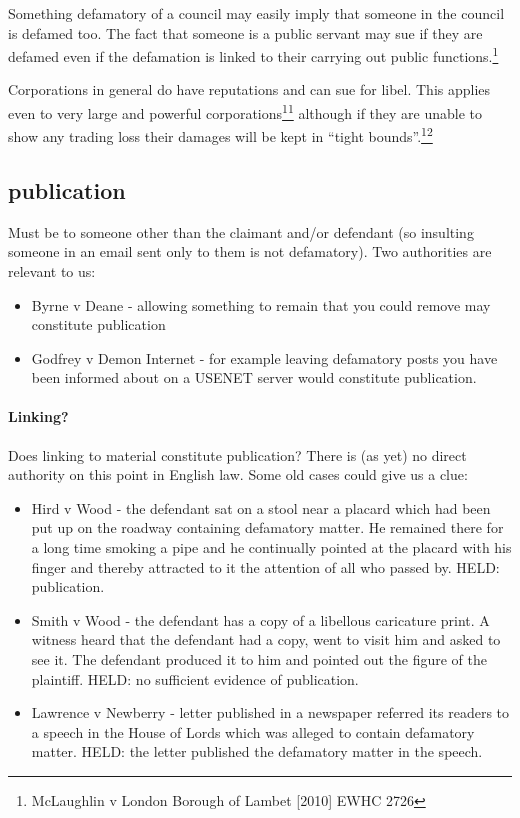 \documentclass[]{article}
\begin{document}
Something defamatory of a council may easily imply that someone in the
council is defamed too. The fact that someone is a public servant may sue if they are defamed even if the defamation is linked to their carrying out public functions.\footnote{McLaughlin v London Borough of Lambet [2010] EWHC 2726}

Corporations in general do have reputations and can sue for libel. This
applies even to very large and powerful
corporations\hyperref[sdfootnote11sym]{\textsuperscript{11}} although if
they are unable to show any trading loss their damages will be kept in
``tight bounds''.\hyperref[sdfootnote12sym]{\textsuperscript{12}}

\subsection{publication}

Must be to someone other than the claimant and/or defendant (so
insulting someone in an email sent only to them is not defamatory). Two
authorities are relevant to us:

\begin{itemize}
\item
  Byrne v Deane - allowing something to remain that you could remove may
  constitute publication
\item
  Godfrey v Demon Internet - for example leaving defamatory posts you
  have been informed about on a USENET server would constitute
  publication.
\end{itemize}

\paragraph{Linking?}

Does linking to material constitute publication? There is (as yet) no
direct authority on this point in English law. Some old cases could give
us a clue:

\begin{itemize}
\item
  Hird v Wood - the defendant sat on a stool near a placard which had
  been put up on the roadway containing defamatory matter. He remained
  there for a long time smoking a pipe and he continually pointed at the
  placard with his finger and thereby attracted to it the attention of
  all who passed by. HELD: publication.
\item
  Smith v Wood - the defendant has a copy of a libellous caricature
  print. A witness heard that the defendant had a copy, went to visit
  him and asked to see it. The defendant produced it to him and pointed
  out the figure of the plaintiff. HELD: no sufficient evidence of
  publication.
\item
  Lawrence v Newberry - letter published in a newspaper referred its
  readers to a speech in the House of Lords which was alleged to contain
  defamatory matter. HELD: the letter published the defamatory matter in
  the speech.
\end{itemize}
\end{document}
